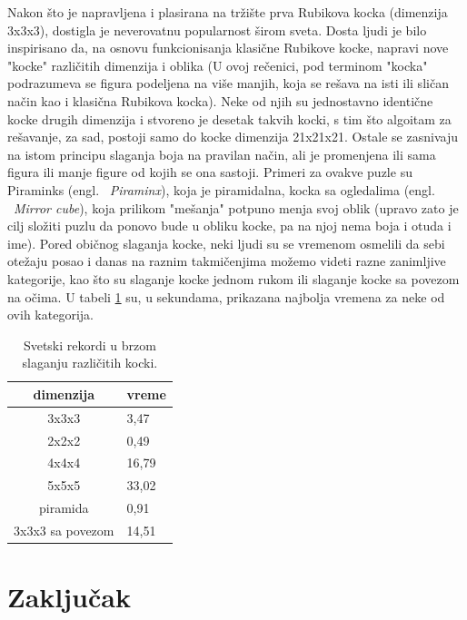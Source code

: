 \documentclass[a4paper]{article}
\begin{document}
Nakon što je napravljena i plasirana na tržište prva Rubikova kocka (dimenzija 3x3x3), dostigla je neverovatnu popularnost širom sveta. Dosta ljudi je bilo inspirisano da, na osnovu funkcionisanja klasične Rubikove kocke, napravi nove "kocke" različitih dimenzija i oblika (U ovoj rečenici, pod terminom "kocka" podrazumeva se figura podeljena na više manjih, koja se rešava na isti ili sličan način kao i klasična Rubikova kocka). Neke od njih su jednostavno identične kocke drugih dimenzija i stvoreno je desetak takvih kocki, s tim što algoitam za rešavanje, za sad, postoji samo do kocke dimenzija 21x21x21. Ostale se zasnivaju na istom principu slaganja boja na pravilan način, ali je promenjena ili sama figura ili manje figure od kojih se ona sastoji. Primeri za ovakve puzle su Piraminks (engl. ~{\em Piraminx}), koja je piramidalna, kocka sa ogledalima (engl. ~{\em Mirror cube}), koja prilikom "mešanja" potpuno menja svoj oblik (upravo zato je cilj složiti puzlu da ponovo bude u obliku kocke, pa na njoj nema boja i otuda i ime). Pored običnog slaganja kocke, neki ljudi su se vremenom osmelili da sebi otežaju posao i danas na raznim takmičenjima možemo videti razne zanimljive kategorije, kao što su slaganje kocke jednom rukom ili slaganje kocke sa povezom na očima. U tabeli \ref{tab:tabela1} su, u sekundama, prikazana najbolja vremena za neke od ovih kategorija.\cite{rekordi} 

\begin{table}[h!]
\begin{center}
\caption{Svetski rekordi u brzom slaganju različitih kocki.}
\begin{tabular}{|c|l|} \hline
\textbf{dimenzija}& \textbf{vreme}\\ \hline
3x3x3 &3,47\\ \hline
2x2x2 &0,49\\ \hline
4x4x4 &16,79\\ \hline
5x5x5 &33,02\\ \hline
piramida &0,91\\ \hline
3x3x3 sa povezom &14,51\\ \hline
\end{tabular}
\label{tab:tabela1}
\end{center}
\end{table}

\section{Zaključak}
\label{sec:zakljucak}
\end{document}
